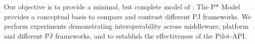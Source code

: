 \documentclass{sig-alternate}
\begin{document}

Our objective is to provide a minimal, but complete model of
\pilotjobs: The P* Model provides a conceptual basis to compare and
contrast different PJ frameworks.  We perform experiments
demonstrating interoperability across middleware, platform and
different PJ frameworks, and to establish the effectiveness of the
Pilot-API.








\end{document}
